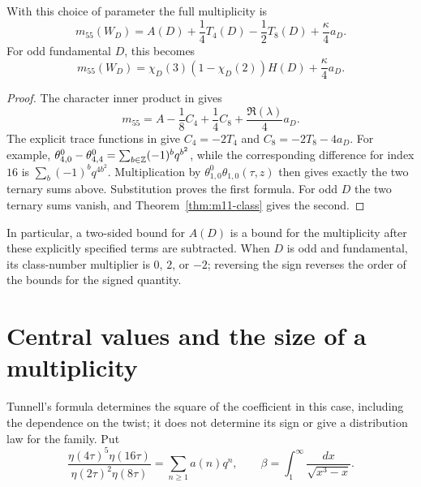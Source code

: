 \begin{proposition}\label{prop:m11-full}
With this choice of parameter the full multiplicity is
\[
 m_{55}(W_D)=A(D)+\frac14T_4(D)-\frac12T_8(D)
                       +\frac{\kappa}{4}a_D.
\]
For odd fundamental \(D\), this becomes
\[
 m_{55}(W_D)=
 \chi_D(3)(1-\chi_D(2))H(D)+\frac{\kappa}{4}a_D.
\]
\end{proposition}
\begin{proof}
The character inner product in
\cite[equation~(4.3.1)]{CDM2025} gives
\[
 m_{55}=A-\frac18C_4+\frac14C_8+
                          \frac{\Re(\lambda)}4a_D.
\]
The explicit trace functions in
\cite[equation~(4.2.11)]{CDM2025} give
\(C_4=-2T_4\) and \(C_8=-2T_8-4a_D\).
For example,
\(\theta^0_{4,0}-\theta^0_{4,4}
=\sum_{b\in\mathbb Z}(-1)^bq^{b^2}\), while the corresponding
difference for index \(16\) is
\(\sum_b(-1)^bq^{4b^2}\).
Multiplication by \(\theta^0_{1,0}\theta_{1,0}(\tau,z)\)
then gives exactly the two ternary sums above.
Substitution proves the first formula. For odd \(D\) the two
ternary sums vanish, and Theorem~\ref{thm:m11-class} gives the second.
\end{proof}

In particular, a two-sided bound for \(A(D)\) is a bound for
the multiplicity after these explicitly specified terms are subtracted.
When \(D\) is odd and fundamental, its class-number multiplier is
\(0\), \(2\), or \(-2\); reversing the sign reverses the order of
the bounds for the signed quantity.

\section{Central values and the size of a multiplicity}
Tunnell's formula determines the square of the coefficient in this
case, including the dependence on the twist; it does not determine
its sign or give a distribution law for the family.
Put
\[
 \frac{\eta(4\tau)^5\eta(16\tau)}
      {\eta(2\tau)^2\eta(8\tau)}
       =\sum_{n\ge1}a(n)q^n,\qquad
 \beta=\int_1^\infty\frac{dx}{\sqrt{x^3-x}}.
\]



